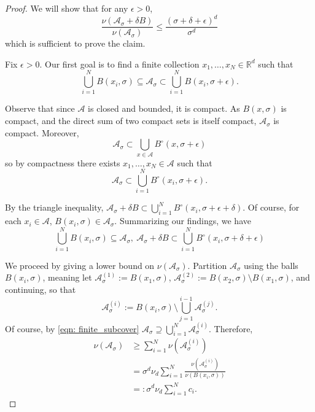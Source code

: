 \documentclass{article}
\newcommand{\Reals}{\mathbb{R}}
\newcommand{\Rd}{\Reals^d}
\newcommand{\Aset}{\mathcal{A}}
\newcommand{\Asig}{\Aset_{\sigma}}
\newcommand{\1}{\mathbf{1}}
\theoremstyle{alden}
\theoremstyle{aldenthm}
\theoremstyle{remark}
\begin{document}
\begin{proof}
	We will show that for any $\epsilon > 0$, 
	\begin{equation}
	\label{eqn: ratio_of_volume}
	\frac{\nu(\Asig + \delta B)}{\nu(\Asig)} \leq \frac{(\sigma + \delta + \epsilon)^d}{\sigma^d}
	\end{equation}
	which is sufficient to prove the claim.
	
	
	Fix $\epsilon > 0$. Our first goal is to find a finite collection $x_1, \ldots, x_N \in \Rd$ such that
	\begin{equation*}
	\bigcup_{i = 1}^{N} B(x_i, \sigma) \subseteq \Asig \subset \bigcup_{i = 1}^{N} B(x_i, \sigma + \epsilon). \tag{$N := N(\epsilon)$}
	\end{equation*}
	
	Observe that since $\Aset$ is closed and bounded, it is compact. As $B(x,\sigma)$ is compact, and the direct sum of two compact sets is itself compact, $\Asig$ is compact. Moreover,
	\begin{equation*}
	\Asig \subset \bigcup_{x \in \Aset} B^{\circ}(x,\sigma + \epsilon)
	\end{equation*}
	so by compactness there exists $x_1, \ldots,x_N \in \Aset$ such that
	\begin{equation*}
	\Asig \subset \bigcup_{i = 1}^{N} B^{\circ}(x_i,\sigma + \epsilon).
	\end{equation*}
	
	By the triangle inequality, $\Asig + \delta B \subset \bigcup_{i = 1}^{N} B^{\circ}(x_i,\sigma + \epsilon + \delta)$. Of course, for each $x_i \in \Aset$, $B(x_i,\sigma) \in \Asig$. Summarizing our findings, we have
	\begin{equation}
	\label{eqn: finite_subcover}
	\bigcup_{i = 1}^{N} B(x_i,\sigma) \subseteq \Asig  ,~\Asig + \delta B \subset \bigcup_{i = 1}^{N} B^{\circ}(x_i,\sigma + \delta + \epsilon)
	\end{equation}

	We proceed by giving a lower bound on $\nu(\Asig)$. Partition $\Asig$ using the balls $B(x_i,\sigma)$, meaning let $\Aset_{\sigma}^{(1)} := B(x_1,\sigma)$, $\Aset_{\sigma}^{(2)} := B(x_2,\sigma) \setminus B(x_1,\sigma)$, and continuing, so that
	\begin{equation*}
	\Aset_{\sigma}^{(i)} := B(x_i,\sigma) \setminus \bigcup_{j = 1}^{i - 1} \Aset_{\sigma}^{(j)}. \tag{$i = 1,\ldots,N$}
	\end{equation*}
	Of course, by \eqref{eqn: finite_subcover} $\Asig \supseteq \bigcup_{i = 1}^{N} \Asig^{(i)}$. Therefore,
	\begin{align*}
	\nu(\Asig) & \geq \sum_{i = 1}^{N} \nu(\Asig^{(i)}) \\
	& = \sigma^d \nu_d \sum_{i = 1}^{N}  \frac{\nu(\Asig^{(i)})}{\nu(B(x_i,\sigma))} \\
	& =: \sigma^d \nu_d \sum_{i = 1}^{N} c_i.
	\end{align*}
	

\end{proof}
\end{document}
